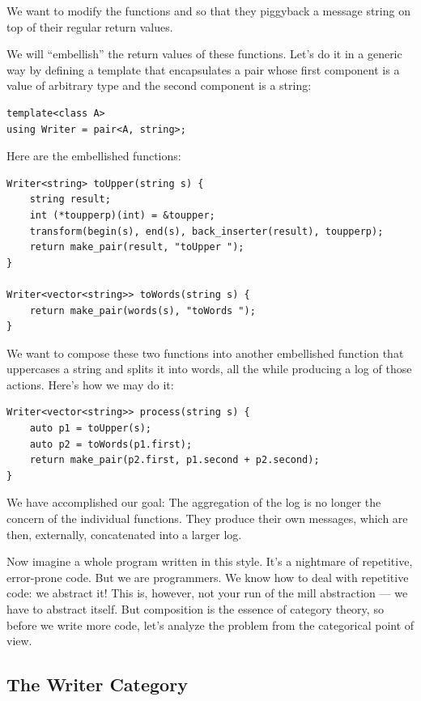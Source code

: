 We want to modify the functions  and  so
that they piggyback a message string on top of their regular return
values.

We will ``embellish'' the return values of these functions. Let's do it
in a generic way by defining a template  that
encapsulates a pair whose first component is a value of arbitrary type
 and the second component is a string:

\begin{verbatim}
template<class A>
using Writer = pair<A, string>;
\end{verbatim}

Here are the embellished functions:

\begin{verbatim}
Writer<string> toUpper(string s) {
    string result;
    int (*toupperp)(int) = &toupper;
    transform(begin(s), end(s), back_inserter(result), toupperp);
    return make_pair(result, "toUpper "); 
}

Writer<vector<string>> toWords(string s) { 
    return make_pair(words(s), "toWords ");
}
\end{verbatim}

We want to compose these two functions into another embellished function
that uppercases a string and splits it into words, all the while
producing a log of those actions. Here's how we may do it:

\begin{verbatim}
Writer<vector<string>> process(string s) {
    auto p1 = toUpper(s);
    auto p2 = toWords(p1.first);
    return make_pair(p2.first, p1.second + p2.second);
}
\end{verbatim}

We have accomplished our goal: The aggregation of the log is no longer
the concern of the individual functions. They produce their own
messages, which are then, externally, concatenated into a larger log.

Now imagine a whole program written in this style. It's a nightmare of
repetitive, error-prone code. But we are programmers. We know how to
deal with repetitive code: we abstract it! This is, however, not your
run of the mill abstraction --- we have to abstract  itself. But composition is the essence of category theory,
so before we write more code, let's analyze the problem from the
categorical point of view.

\subsection{The Writer Category}\label{the-writer-category}


